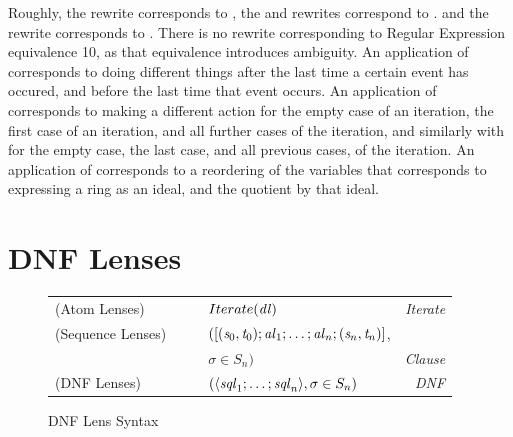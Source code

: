 \documentclass[numbers]{sigplanconf}
\begin{document}
Roughly, the \AtomSumstarRule{} rewrite corresponds to \SumstarRule{},
the \AtomUnrollstarLeftRule{} and \AtomUnrollstarRightRule{} rewrites correspond to \ProductstarRule{}.
and the \DicyclicRewriteStarRule{} rewrite corresponds to \DicyclicityRule{}.
There is no rewrite corresponding to Regular Expression equivalence 10, as that
equivalence introduces ambiguity.
An application of \AtomSumstarRule{} corresponds to doing different things after the last time a certain event has occured, and before the last time that event occurs.
An application of \AtomUnrollstarLeftRule{} corresponds to making a different action for
the empty case of an iteration, the first case of an iteration, and all further cases of the iteration,
and similarly with \AtomUnrollstarRightRule{} for the empty case, the last case, and all previous cases, of the iteration.
An application of \DicyclicRewriteStarRule{} corresponds to a reordering of the
variables that corresponds to expressing a ring as an ideal, and the quotient by
that ideal.
\section{DNF Lenses}

\begin{figure}
\centering
\begin{tabular}{@{}l@{\ }l@{\ }c@{}l@{\ }>{\itshape\/}r@{}}
(Atom Lenses) &\AtomLens{} & \GEq{} & $Iterate(\mathit{dl})$ & Iterate\\
(Sequence Lenses) &\SequenceLens{} & \GEq{} &
$([(\mathit{s}_0,\mathit{t}_0);\mathit{al}_1;\ldots;\mathit{al}_n;(\mathit{s}_n,\mathit{t}_n)]$, &\\
& & & $\sigma \in S_n)$ & Clause\SubN{}\\
(DNF Lenses)& \DNFLens{} & \GEq{} & $(\langle\mathit{sql}_1;\ldots;\mathit{sql}_n\rangle, \sigma \in S_n)$ & DNF\SubN{}\\
\end{tabular}
\caption{DNF Lens Syntax}
\label{fig:dnf-lens-syntax}
\end{figure}
\end{document}
